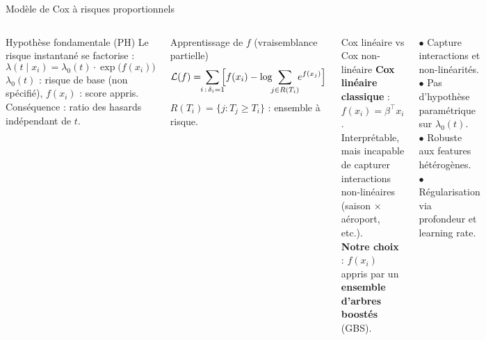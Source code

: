 \documentclass[aspectratio=169,t,11pt]{beamer}
\begin{document}
\begin{frame}{Modèle de Cox à risques proportionnels}
\vspace{-2pt}
\begin{columns}[T]

\begin{block}{Hypothèse fondamentale (PH)}
\footnotesize
Le risque instantané se factorise :
\[ \lambda(t \mid x_i) = \lambda_0(t) \cdot \exp\!\bigl(f(x_i)\bigr) \]
$\lambda_0(t)$ : risque de base (non spécifié), $f(x_i)$ : score appris.
Conséquence : ratio des hasards indépendant de $t$.
\end{block}
\vspace{2pt}
\begin{block}{Apprentissage de $f$ (vraisemblance partielle)}
\footnotesize
\[
\mathcal{L}(f) = \!\!\sum_{i\,:\,\delta_i = 1}\!\!
\Bigl[ f(x_i) - \log\!\!\sum_{j \in R(T_i)}\!\! e^{f(x_j)} \Bigr]
\]
$R(T_i) = \{j : T_j \ge T_i\}$ : ensemble à risque.
\end{block}

\begin{exampleblock}{Cox linéaire vs Cox non-linéaire}
\footnotesize
\textbf{Cox linéaire classique} : $f(x_i) = \beta^\top x_i$.
Interprétable, mais incapable de capturer interactions non-linéaires
(saison $\times$ aéroport, etc.).\\[3pt]
\textbf{Notre choix} : $f(x_i)$ appris par un \textbf{ensemble d'arbres boostés} (GBS).
\end{exampleblock}
\vspace{3pt}
\begin{tcolorbox}[mybox,colback=metMid!10,colframe=metMid,
  title={Pourquoi le boosting ?}]
\scriptsize
$\bullet$ Capture interactions et non-linéarités.\\
$\bullet$ Pas d'hypothèse paramétrique sur $\lambda_0(t)$.\\
$\bullet$ Robuste aux features hétérogènes.\\
$\bullet$ Régularisation via profondeur et learning rate.
\end{tcolorbox}
\end{columns}
\end{frame}
\end{document}

